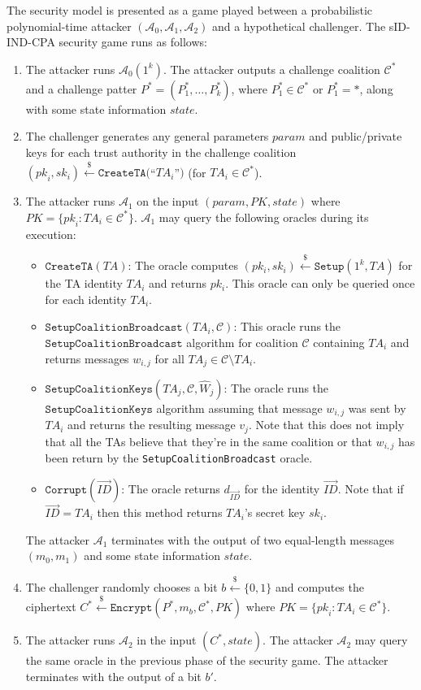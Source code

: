 \documentclass{IEEEtran}
\newcommand{\A}{\mathcal{A}}
\newcommand{\C}{\mathcal{C}}
\newcommand{\ID}{\mathit{ID}}
\newcommand{\TA}{\mathit{TA}}
\newcommand{\param}{\mathit{param}}
\newcommand{\pk}{\mathit{pk}}
\newcommand{\sk}{\mathit{sk}}
\newcommand{\getsr}{\stackrel{{\scriptscriptstyle\$}}{\gets}}
\begin{document}
The security model is presented as a game played between a
probabilistic polynomial-time attacker $(\A_{0},\A_{1},\A_{2})$ and
a hypothetical challenger. The sID-IND-CPA security game runs as
follows:
\begin{enumerate}
\item The attacker runs $\A_{0}(1^{k})$. The attacker outputs a
challenge coalition $\C^{*}$ and a challenge patter
$P^{*}=(P^{*}_{1},\ldots,P^{*}_{k})$, where $P^{*}_{1} \in
\C^{*}$ or $P^{*}_{1} = *$, along with some state information $\mathit{state}$.
\item The challenger generates any general parameters $\param$ and
public/private keys for each trust authority in the challenge
coalition $(\pk_{i},\sk_{i}) \getsr
\texttt{CreateTA}($``$\TA_{i}$''$)$ (for $\TA_{i} \in \C^{*}$).
\item The attacker runs $\A_{1}$ on the input $(\param,\mathit{PK},\mathit{state})$
where $\mathit{PK} = \{ \pk_{i} : \TA_{i} \in \C^{*}\}$.
$\A_{1}$ may query the following oracles during its execution:
\begin{itemize}
\item $\texttt{CreateTA}(\TA)$: The oracle computes
$(pk_i,sk_i)\getsr \texttt{Setup}(1^{k},\TA)$ for the TA
identity $\TA_i$ and returns $pk_i$. This oracle can only be
queried once for each identity $\TA_i$.

\item $\texttt{SetupCoalitionBroadcast}(\TA_i,\C)$: This oracle runs
the $\texttt{SetupCoalitionBroadcast}$ algorithm for
coalition $\C$ containing $\TA_i$ and returns messages
$w_{i,j}$ for all $\TA_j \in \C \setminus \TA_i$.

\item $\texttt{SetupCoalitionKeys}(\TA_j, \C, \hat{W}_{j})$: The
oracle runs the $\texttt{SetupCoalitionKeys}$ algorithm
assuming that message $w_{i,j}$ was sent by $\TA_{i}$ and
returns the resulting message $v_{j}$. Note that this does
not imply that all the TAs believe that they're in the same
coalition or that $w_{i,j}$ has been return by the
\texttt{SetupCoalitionBroadcast} oracle.

\item $\texttt{Corrupt}(\vec{\ID})$: The oracle returns $d_{\vec{\ID}}$
for the identity $\vec{\ID}$.  Note that if $\vec{\ID} =
TA_i$ then this method returns $\TA_i$'s secret key $sk_i$.
\end{itemize}
The attacker $\A_{1}$ terminates with the output of two
equal-length messages $(m_{0},m_{1})$ and some state information
$\mathit{state}$.
\item The challenger randomly chooses a bit $b\getsr \{0,1\}$ and
computes the ciphertext $C^{*} \getsr
\texttt{Encrypt}(P^{*},m_{b},\C^{*},\mathit{PK})$ where $\mathit{PK} = \{ \pk_{i} : \TA_{i} \in \C^{*}\}$.
\item The attacker runs $\A_{2}$ in the input
$(C^{*},\mathit{state})$. The attacker $\A_{2}$ may query the
same oracle in the previous phase of the security game. The
attacker terminates with the output of a bit $b'$.
\end{enumerate}
\end{document}
